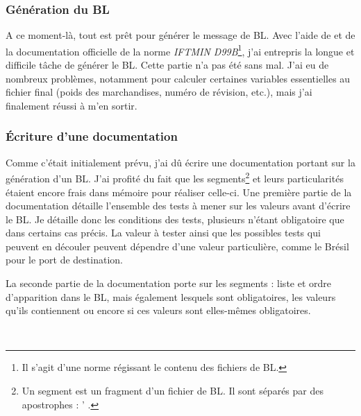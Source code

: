 \subsubsection{Génération du BL}
A ce moment-là, tout est prêt pour générer le message de BL. Avec l'aide de \pireus{} et de la documentation officielle de la norme \emph{IFTMIN D99B}\footnote{Il s'agit d'une norme régissant le contenu des fichiers de BL.}, j'ai entrepris la longue et difficile tâche de générer le BL. Cette partie n'a pas été sans mal. J'ai eu de nombreux problèmes, notamment pour calculer certaines variables essentielles au fichier final (poids des marchandises, numéro de révision, etc.), mais j'ai finalement réussi à m'en sortir.

\subsubsection{Écriture d'une documentation}
Comme c'était initialement prévu, j'ai dû écrire une documentation portant sur la génération d'un BL. J'ai profité du fait que les segments\footnote{Un segment est un fragment d'un fichier de BL. Il sont séparés par des apostrophes : \og ' \fg.} et leurs particularités étaient encore frais dans mémoire pour réaliser celle-ci. Une première partie de la documentation détaille l'ensemble des tests à mener sur les valeurs avant d'écrire le BL. Je détaille donc les conditions des tests, plusieurs n'étant obligatoire que dans certains cas précis. La valeur à tester ainsi que les possibles tests qui peuvent en découler peuvent dépendre d'une valeur particulière, comme le Brésil pour le port de destination.

La seconde partie de la documentation porte sur les segments : liste et ordre d'apparition dans le BL, mais également lesquels sont obligatoires, les valeurs qu'ils contiennent ou encore si ces valeurs sont elles-mêmes obligatoires.

~

